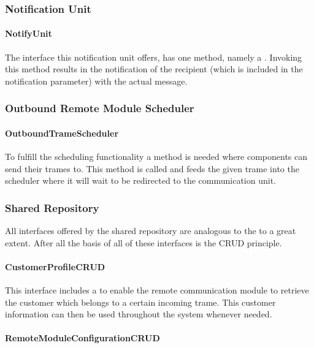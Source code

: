 \subsubsection{Notification Unit}

\paragraph{NotifyUnit}

\npar The interface this notification unit offers, has one method, namely a
. Invoking this method results in the notification of
the recipient (which is included in the notification parameter) with the actual
message.

\subsubsection{Outbound Remote Module Scheduler}

\paragraph{OutboundTrameScheduler}

\npar To fulfill the scheduling functionality a method is needed where
components can send their trames to. This method is called
 and feeds the given trame into the scheduler where it
will wait to be redirected to the communication unit.

\subsubsection{Shared Repository} 

\npar All interfaces offered by the shared repository are analogous to the
 to a great extent. After all the basis of all of these
interfaces is the CRUD principle.

\paragraph{CustomerProfileCRUD}
\npar This interface includes a  to
enable the remote communication module to retrieve the customer which belongs to
a certain incoming trame. This customer information can then be used throughout
the system whenever needed.

\paragraph{RemoteModuleConfigurationCRUD}

